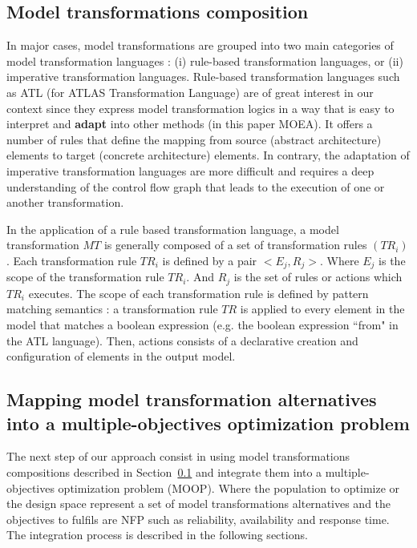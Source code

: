 \documentclass[conference]{IEEEtran}
\begin{document}
\subsection{Model transformations composition}
\label{transfos}
In major cases, model transformations are grouped into two main categories of model transformation languages : (i) rule-based transformation languages, or (ii) imperative transformation languages\cite{Gorp06integratinga}. Rule-based transformation languages such as ATL (for ATLAS Transformation Language) are of great interest in our context since they express model transformation logics in a way that is easy to interpret and \textbf{adapt} into other methods (in this paper MOEA). It offers a number of rules that define the mapping from source (abstract architecture) elements to target (concrete architecture) elements. In contrary, the adaptation of imperative transformation languages are more difficult and requires a deep understanding of the control flow graph that leads to the execution of one or another transformation.

In the application of a rule based transformation language, a model transformation $MT$ is generally composed of a set of transformation rules $(TR_{i})$.
Each transformation rule $TR_{i}$ is defined by a pair $<E_{j},R_{j}>$. Where $E_{j}$ is the scope of the transformation rule $TR_{i}$. And $R_{j}$ is the set of rules or actions which $TR_{i}$ executes. The scope of each transformation rule is defined by pattern matching semantics : a transformation rule $TR$ is applied to every element in the model that matches a boolean expression (e.g. the boolean expression ``from" in the ATL language). Then, actions consists of a declarative creation and configuration of elements in the output model.

\subsection{Mapping model transformation alternatives into a multiple-objectives optimization problem}
\label{Adapting}
The next step of our approach consist in using model transformations compositions described in Section~\ref{transfos} and integrate them into a multiple-objectives optimization problem (MOOP). Where the population to optimize or the design space represent a set of model transformations alternatives and the objectives to fulfils are NFP such as reliability, availability and response time. The integration process is described in the following sections.
\end{document}
